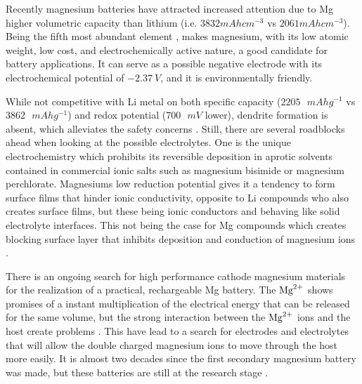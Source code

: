 	Recently magnesium batteries have attracted increased attention due to Mg higher volumetric capacity than lithium (i.e. $3832 \si{mAh cm^{-3}}$ vs $2061 \si{mAh cm^{-3}}$). Being the fifth most abundant element \cite{muldoon2012electrolyte}, makes magnesium, with its low atomic weight, low cost, and electrochemically active nature, a good candidate for battery applications. It can serve as a possible negative electrode with its electrochemical potential of $\SI{-2.37}{V}$, and it is environmentally friendly. 

	 While not competitive with Li metal on both specific capacity ($2205\text{ } \si{mAh g^{-1}}$ vs $3862\text{ } \si{mAh g^{-1}}$) and redox potential ($700\text{ }\si{mV}$ lower), dendrite formation is absent, which alleviates the safety concerns \cite{aurbach2003nonaqueous}. Still, there are several roadblocks ahead when looking at the possible electrolytes. One is the unique electrochemistry which prohibits its reversible deposition in aprotic solvents contained in commercial ionic salts such as magnesium bisimide or magnesium perchlorate. Magnesiums low reduction potential gives it a tendency to form surface films  that hinder ionic conductivity, opposite to Li compounds who also creates surface films, but these being ionic conductors and behaving like solid electrolyte interfaces. This not being the case for Mg compounds which creates blocking surface layer that inhibits deposition and conduction of magnesium ions \cite{aurbach2001comparison} \cite{gnanaraj2003improving}.
	
	There is an ongoing search for high performance cathode magnesium materials for the realization of a practical, rechargeable Mg battery. The $\ce{Mg^2+}$ shows promises of a instant multiplication of the electrical energy that can be released for the same volume, but the strong interaction between the $\ce{Mg^2+}$ ions and the host create problems \cite{van2014rechargeable}. This have lead to a search for electrodes and electrolytes that will allow the double charged magnesium ions to move through the host more easily. It is almost two decades since the first secondary magnesium battery was made, but these batteries are still at the research stage \cite{attias2019anode}.
 




